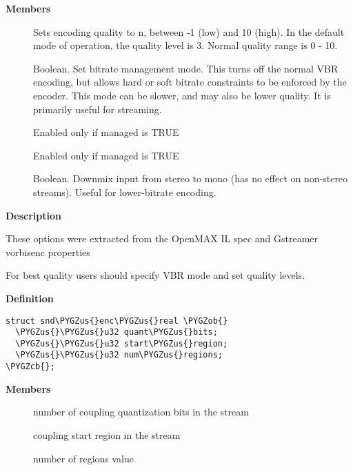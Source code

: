 \documentclass[a4paper,8pt,english]{sphinxmanual}
\def\PYGZus{\char`\_}
\def\PYGZob{\char`\{}
\def\PYGZcb{\char`\}}
\begin{document}
\textbf{Members}
\begin{description}
\item[{}] \leavevmode
Sets encoding quality to n, between -1 (low) and 10 (high).
In the default mode of operation, the quality level is 3.
Normal quality range is 0 - 10.

\item[{}] \leavevmode
Boolean. Set  bitrate  management  mode. This turns off the
normal VBR encoding, but allows hard or soft bitrate constraints to be
enforced by the encoder. This mode can be slower, and may also be
lower quality. It is primarily useful for streaming.

\item[{}] \leavevmode
Enabled only if managed is TRUE

\item[{}] \leavevmode
Enabled only if managed is TRUE

\item[{}] \leavevmode
Boolean. Downmix input from stereo to mono (has no effect on
non-stereo streams). Useful for lower-bitrate encoding.

\end{description}

\textbf{Description}

These options were extracted from the OpenMAX IL spec and Gstreamer vorbisenc
properties

For best quality users should specify VBR mode and set quality levels.

\begin{fulllineitems}
\label{sound/kernel-api/alsa-driver-api:c.snd_enc_real}
\end{fulllineitems}


\textbf{Definition}

\begin{Verbatim}[commandchars=\\\{\}]
struct snd\PYGZus{}enc\PYGZus{}real \PYGZob{}
  \PYGZus{}\PYGZus{}u32 quant\PYGZus{}bits;
  \PYGZus{}\PYGZus{}u32 start\PYGZus{}region;
  \PYGZus{}\PYGZus{}u32 num\PYGZus{}regions;
\PYGZcb{};
\end{Verbatim}

\textbf{Members}
\begin{description}
\item[{}] \leavevmode
number of coupling quantization bits in the stream

\item[{}] \leavevmode
coupling start region in the stream

\item[{}] \leavevmode
number of regions value

\end{description}
\end{document}

